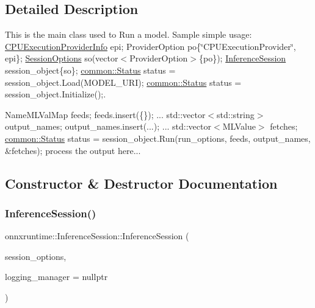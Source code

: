 \subsection{Detailed Description}
This is the main class used to Run a model. Sample simple usage\+: \mbox{\hyperlink{structonnxruntime_1_1CPUExecutionProviderInfo}{C\+P\+U\+Execution\+Provider\+Info}} epi; Provider\+Option po\{\char`\"{}\+C\+P\+U\+Execution\+Provider\char`\"{}, epi\}; \mbox{\hyperlink{structonnxruntime_1_1SessionOptions}{Session\+Options}} so(vector$<$\+Provider\+Option$>$\{po\}); \mbox{\hyperlink{classonnxruntime_1_1InferenceSession}{Inference\+Session}} session\+\_\+object\{so\}; \mbox{\hyperlink{classonnxruntime_1_1common_1_1Status}{common\+::\+Status}} status = session\+\_\+object.\+Load(\+M\+O\+D\+E\+L\+\_\+\+U\+R\+I); \mbox{\hyperlink{classonnxruntime_1_1common_1_1Status}{common\+::\+Status}} status = session\+\_\+object.\+Initialize();. 

Name\+M\+L\+Val\+Map feeds; feeds.\+insert(\{\}); ... std\+::vector$<$std\+::string$>$ output\+\_\+names; output\+\_\+names.\+insert(...); ... std\+::vector$<$\+M\+L\+Value$>$ fetches; \mbox{\hyperlink{classonnxruntime_1_1common_1_1Status}{common\+::\+Status}} status = session\+\_\+object.\+Run(run\+\_\+options, feeds, output\+\_\+names, \&fetches); process the output here... 

\subsection{Constructor \& Destructor Documentation}
\mbox{\label{classonnxruntime_1_1InferenceSession_ae17b4c203f1a897ba86b7858d6984156}} 
\subsubsection{\texorpdfstring{Inference\+Session()}{InferenceSession()}}
{\footnotesize\ttfamily onnxruntime\+::\+Inference\+Session\+::\+Inference\+Session (\begin{DoxyParamCaption}\item[{const \mbox{\hyperlink{structonnxruntime_1_1SessionOptions}{Session\+Options}} \&}]{session\+\_\+options,  }\item[{\mbox{\hyperlink{classonnxruntime_1_1logging_1_1LoggingManager}{logging\+::\+Logging\+Manager}} $\ast$}]{logging\+\_\+manager = {\ttfamily nullptr} }\end{DoxyParamCaption})\hspace{0.3cm}{\ttfamily [explicit]}}

